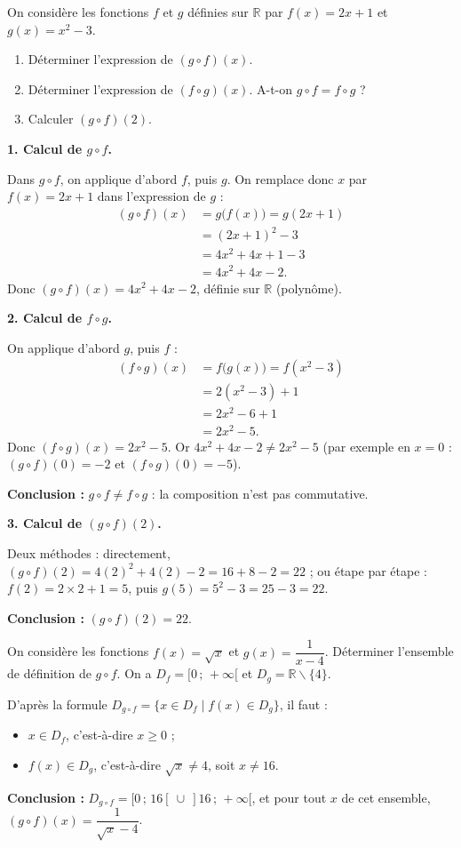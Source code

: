 \documentclass[11pt]{article}
\def\setminus{\mathbin{\backslash}}\let\smallsetminus\setminus
\begin{document}
\begin{exoresolu}
On considère les fonctions $f$ et $g$ définies sur $\mathbb{R}$ par $f(x)=2x+1$ et $g(x)=x^2-3$.
\begin{enumerate}
\item Déterminer l'expression de $(g\circ f)(x)$.
\item Déterminer l'expression de $(f\circ g)(x)$. A-t-on $g\circ f=f\circ g$ ?
\item Calculer $(g\circ f)(2)$.
\end{enumerate}
\tcblower
\textbf{1. Calcul de $g\circ f$.}

Dans $g\circ f$, on applique d'abord $f$, puis $g$. On remplace donc $x$ par $f(x)=2x+1$ dans l'expression de $g$ :
\begin{align*}
(g\circ f)(x) &= g\bigl(f(x)\bigr) = g(2x+1)\\
&= (2x+1)^2-3\\
&= 4x^2+4x+1-3\\
&= 4x^2+4x-2.
\end{align*}
Donc $(g\circ f)(x)=4x^2+4x-2$, définie sur $\mathbb{R}$ (polynôme).

\textbf{2. Calcul de $f\circ g$.}

On applique d'abord $g$, puis $f$ :
\begin{align*}
(f\circ g)(x) &= f\bigl(g(x)\bigr) = f(x^2-3)\\
&= 2(x^2-3)+1\\
&= 2x^2-6+1\\
&= 2x^2-5.
\end{align*}
Donc $(f\circ g)(x)=2x^2-5$. Or $4x^2+4x-2\neq 2x^2-5$ (par exemple en $x=0$ : $(g\circ f)(0)=-2$ et $(f\circ g)(0)=-5$).

\textbf{Conclusion :} $g\circ f\neq f\circ g$ : la composition n'est pas commutative.

\textbf{3. Calcul de $(g\circ f)(2)$.}

Deux méthodes : directement, $(g\circ f)(2)=4(2)^2+4(2)-2=16+8-2=22$ ; ou étape par étape : $f(2)=2\times 2+1=5$, puis $g(5)=5^2-3=25-3=22$.

\textbf{Conclusion :} $(g\circ f)(2)=22$.
\end{exoresolu}

\begin{exoresolu}
On considère les fonctions $f(x)=\sqrt{x}$ et $g(x)=\dfrac{1}{x-4}$. Déterminer l'ensemble de définition de $g\circ f$.
\tcblower
On a $D_f=[0\,;\,+\infty[$ et $D_g=\mathbb{R}\setminus\{4\}$.

D'après la formule $D_{g\circ f}=\{x\in D_f \mid f(x)\in D_g\}$, il faut :
\begin{itemize}
\item $x\in D_f$, c'est-à-dire $x\geq 0$ ;
\item $f(x)\in D_g$, c'est-à-dire $\sqrt{x}\neq 4$, soit $x\neq 16$.
\end{itemize}
\textbf{Conclusion :} $D_{g\circ f}=[0\,;\,16[\ \cup\ ]16\,;\,+\infty[$, et pour tout $x$ de cet ensemble, $(g\circ f)(x)=\dfrac{1}{\sqrt{x}-4}$.
\end{exoresolu}
\end{document}
